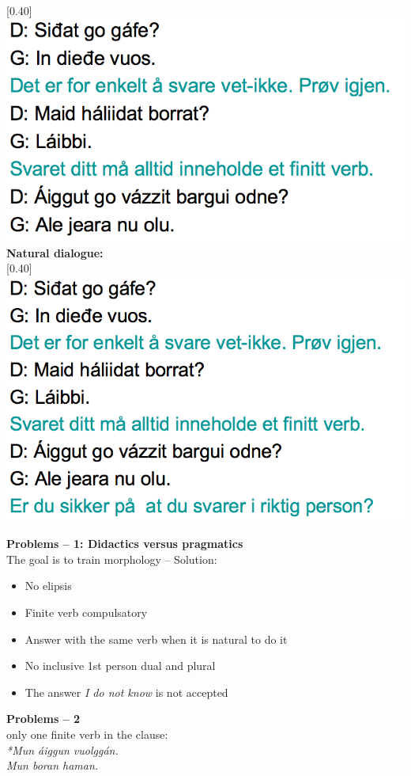 \documentclass[landscape,norsk,11pt]{seminar}
\begin{document}
\begin{slide}
\scalebox{0.40}[0.40]{\includegraphics{img/lgiella5.png}} 
\newslide
\textbf{Natural dialogue:} \\

\scalebox{0.40}[0.40]{\includegraphics{img/lgiella6.png}} 


\newslide
\textbf{Problems -- 1: Didactics versus pragmatics} \\
The goal is to train morphology -- Solution:
\begin{itemize}
\item{No elipsis}
\item{Finite verb compulsatory}
\item{Answer with the same verb when it is natural to do it}
\item{No inclusive 1st person dual and plural}
\item{The answer \textit{I do not know} is not accepted}
\end{itemize}




\newslide
\textbf{Problems -- 2} \\
only one finite verb in the clause: \\
\textit{*Mun áiggun vuolggán.}\\
\textit{Mun boran haman.}\\


\end{slide}
\end{document}
